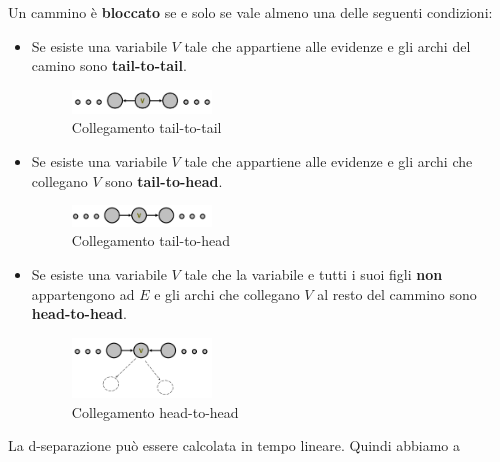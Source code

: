 \begin{definizione}
    Un cammino è \textbf{bloccato} se e solo se vale almeno una delle seguenti
    condizioni:
    \begin{itemize}
        \item Se esiste una variabile $V$ tale che appartiene alle evidenze e
              gli archi del camino sono \textbf{tail-to-tail}.
              \begin{figure}[!ht]
                  \centering
                  \includegraphics[width=0.35\textwidth]{./img/Reti/TailToTail.png}
                  \caption{Collegamento tail-to-tail}
                  \label{fig:tail-to-tail}
              \end{figure}
        \item Se esiste una variabile $V$ tale che appartiene alle evidenze e
              gli archi che collegano $V$ sono \textbf{tail-to-head}.
              \begin{figure}[!ht]
                  \centering
                  \includegraphics[width=0.35\textwidth]{./img/Reti/TailToHead.png}
                  \caption{Collegamento tail-to-head}
                  \label{fig:tail-to-head}
              \end{figure}
        \item Se esiste una variabile $V$ tale che la variabile e tutti i suoi figli
              \textbf{non} appartengono ad $E$ e gli archi che collegano $V$ al
              resto del cammino sono \textbf{head-to-head}.
              \begin{figure}[!ht]
                  \centering
                  \includegraphics[width=0.35\textwidth]{./img/Reti/HeadToHead.png}
                  \caption{Collegamento head-to-head}
                  \label{fig:head-to-head}
              \end{figure}
    \end{itemize}
\end{definizione}
La d-separazione può essere calcolata in tempo lineare. Quindi abbiamo a
